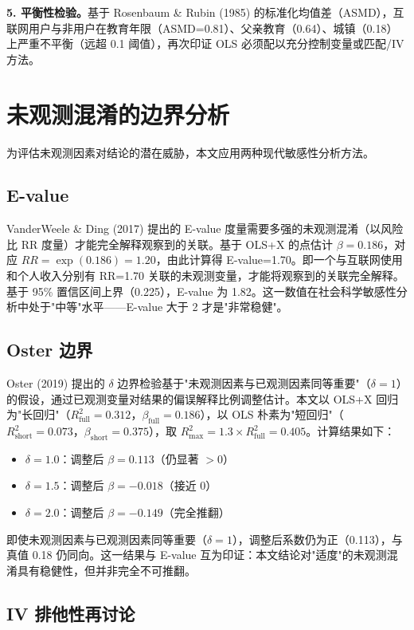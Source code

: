 \documentclass[a4paper,11pt]{article}
\begin{document}
\textbf{5. 平衡性检验。}基于 Rosenbaum \& Rubin (1985) 的标准化均值差（ASMD），互联网用户与非用户在教育年限（ASMD=0.81）、父亲教育（0.64）、城镇（0.18）上严重不平衡（远超 0.1 阈值），再次印证 OLS 必须配以充分控制变量或匹配/IV 方法。

\section{未观测混淆的边界分析}

为评估未观测因素对结论的潜在威胁，本文应用两种现代敏感性分析方法。

\subsection{E-value}

VanderWeele \& Ding (2017) 提出的 E-value 度量需要多强的未观测混淆（以风险比 RR 度量）才能完全解释观察到的关联。基于 OLS+X 的点估计 $\beta=0.186$，对应 $RR=\exp(0.186)=1.20$，由此计算得 E-value=1.70。即一个与互联网使用和个人收入分别有 RR=1.70 关联的未观测变量，才能将观察到的关联完全解释。基于 95\% 置信区间上界（0.225），E-value 为 1.82。这一数值在社会科学敏感性分析中处于"中等"水平——E-value 大于 2 才是"非常稳健"。

\subsection{Oster 边界}

Oster (2019) 提出的 $\delta$ 边界检验基于"未观测因素与已观测因素同等重要"（$\delta=1$）的假设，通过已观测变量对结果的偏误解释比例调整估计。本文以 OLS+X 回归为"长回归"（$R^2_{\text{full}}=0.312$，$\beta_{\text{full}}=0.186$），以 OLS 朴素为"短回归"（$R^2_{\text{short}}=0.073$，$\beta_{\text{short}}=0.375$），取 $R^2_{\text{max}}=1.3 \times R^2_{\text{full}}=0.405$。计算结果如下：
\begin{itemize}
    \item $\delta=1.0$：调整后 $\beta = 0.113$（仍显著 $>0$）
    \item $\delta=1.5$：调整后 $\beta = -0.018$（接近 0）
    \item $\delta=2.0$：调整后 $\beta = -0.149$（完全推翻）
\end{itemize}
即使未观测因素与已观测因素同等重要（$\delta=1$），调整后系数仍为正（0.113），与真值 0.18 仍同向。这一结果与 E-value 互为印证：本文结论对"适度"的未观测混淆具有稳健性，但并非完全不可推翻。

\subsection{IV 排他性再讨论}
\end{document}

